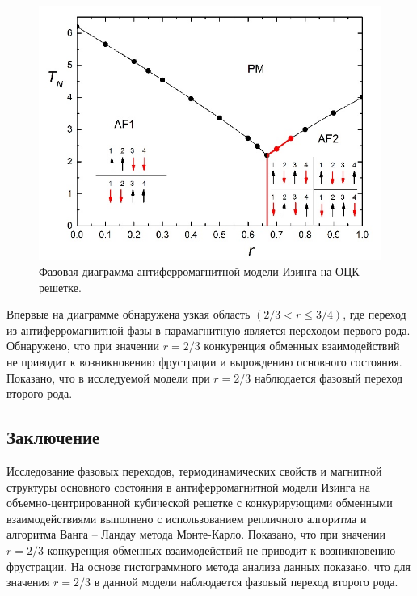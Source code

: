 \begin{figure}[H]
	\centering
	\includegraphics[width=0.5\linewidth]{content/sections/images/phys1-1}
	\caption{Фазовая диаграмма антиферромагнитной модели Изинга на ОЦК решетке.}
	\label{phys1-pic-1}
\end{figure}

Впервые на диаграмме обнаружена узкая область $(2/3 < r \leq 3/4)$, где переход из антиферромагнитной фазы в парамагнитную является переходом первого рода. Обнаружено, что при значении $r=2/3$ конкуренция обменных взаимодействий не приводит к возникновению фрустрации и вырождению основного состояния. Показано, что в исследуемой модели при $r = 2/3$ наблюдается фазовый переход второго рода.






\subsection{Заключение}



Исследование фазовых переходов, термодинамических свойств и магнитной структуры основного состояния в антиферромагнитной модели Изинга на объемно-центрированной кубической решетке с конкурирующими обменными взаимодействиями выполнено с использованием репличного алгоритма и алгоритма Ванга -- Ландау метода Монте-Карло. Показано, что при значении $r=2/3$ конкуренция обменных взаимодействий не приводит к возникновению фрустрации. На основе гистограммного метода анализа данных показано, что для значения $r=2/3$ в данной модели наблюдается фазовый переход второго рода.


